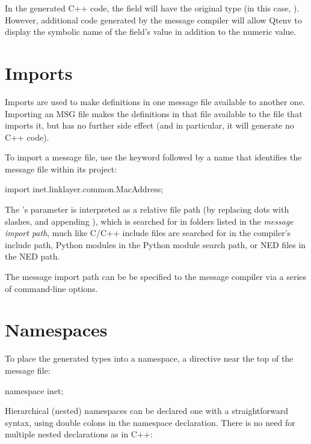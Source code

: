 In the generated C++ code, the field will have the original type (in this case,
). However, additional code generated by the message compiler
will allow Qtenv to display the symbolic name of the field's value in addition
to the numeric value.


\section{Imports}
\label{sec:msg-defs:imports}

Imports are used to make definitions in one message file available to another
one. Importing an MSG file makes the definitions in that file available to the
file that imports it, but has no further side effect (and in particular, it will
generate no C++ code).

To import a message file, use the  keyword followed by a name
that identifies the message file within its project:

\begin{msg}
import inet.linklayer.common.MacAddress;
\end{msg}

The 's parameter is interpreted as a relative file path (by
replacing dots with slashes, and appending ), which is searched for in
folders listed in the \textit{message import path}, much like C/C++ include
files are searched for in the compiler's include path, Python modules in the
Python module search path, or NED files in the NED path.

The message import path can be be specified to the message compiler via a series
of  command-line options.


\section{Namespaces}
\label{sec:msg-defs:namespaces}
\label{sec:msg-defs:declaring-a-namespace} %

To place the generated types into a namespace, a  directive
near the top of the message file:

\begin{msg}
namespace inet;
\end{msg}

Hierarchical (nested) namespaces can be declared one with a straightforward
syntax, using double colons in the namespace declaration. There is no need for
multiple nested  declarations as in C++:

